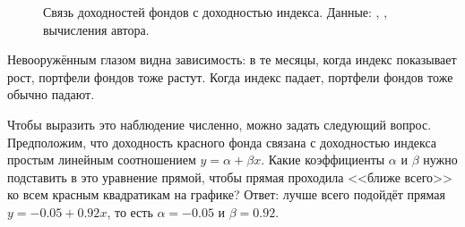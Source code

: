\begin{figure}[h]
\centering
{}
\caption{Связь доходностей фондов с доходностью индекса. Данные: 
\cite{moex2020}, \cite{cbr2020}, вычисления автора.}
\label{fund_regression_figure}
\end{figure}

Невооружённым глазом видна зависимость: в те месяцы, когда индекс показывает 
рост, портфели фондов тоже растут. Когда индекс падает, портфели фондов тоже 
обычно падают.

Чтобы выразить это наблюдение численно, можно задать следующий вопрос. 
Предположим, что доходность красного фонда связана с доходностью индекса простым 
линейным соотношением $y = \alpha + \beta x$. Какие коэффициенты $\alpha$ и 
$\beta$ нужно подставить в это уравнение прямой, чтобы прямая проходила <<ближе 
всего>> ко всем красным квадратикам на графике? Ответ: лучше всего подойдёт 
прямая $y = -0.05 + 0.92x$, то есть $\alpha = -0.05$ и $\beta=0.92$.

